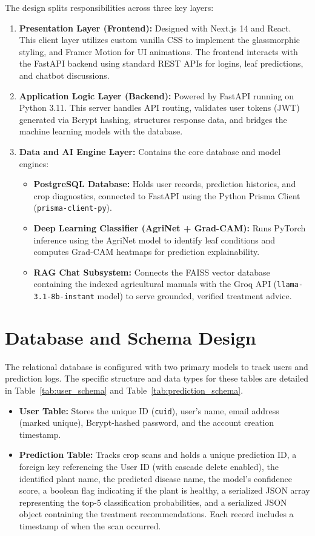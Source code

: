 \documentclass[12pt, a4paper]{report}
\begin{document}
The design splits responsibilities across three key layers:
\begin{enumerate}
    \item \textbf{Presentation Layer (Frontend):} Designed with Next.js 14 and React. This client layer utilizes custom vanilla CSS to implement the glassmorphic styling, and Framer Motion for UI animations. The frontend interacts with the FastAPI backend using standard REST APIs for logins, leaf predictions, and chatbot discussions.
    \item \textbf{Application Logic Layer (Backend):} Powered by FastAPI running on Python 3.11. This server handles API routing, validates user tokens (JWT) generated via Bcrypt hashing, structures response data, and bridges the machine learning models with the database.
    \item \textbf{Data and AI Engine Layer:} Contains the core database and model engines:
    \begin{itemize}
        \item \textbf{PostgreSQL Database:} Holds user records, prediction histories, and crop diagnostics, connected to FastAPI using the Python Prisma Client (\texttt{prisma-client-py}).
        \item \textbf{Deep Learning Classifier (AgriNet + Grad-CAM):} Runs PyTorch inference using the AgriNet model to identify leaf conditions and computes Grad-CAM heatmaps for prediction explainability.
        \item \textbf{RAG Chat Subsystem:} Connects the FAISS vector database containing the indexed agricultural manuals with the Groq API (\texttt{llama-3.1-8b-instant} model) to serve grounded, verified treatment advice.
    \end{itemize}
\end{enumerate}

\section{Database and Schema Design}
The relational database is configured with two primary models to track users and prediction logs. The specific structure and data types for these tables are detailed in Table~\ref{tab:user_schema} and Table~\ref{tab:prediction_schema}.

\begin{itemize}
    \item \textbf{User Table:} Stores the unique ID (\texttt{cuid}), user's name, email address (marked unique), Bcrypt-hashed password, and the account creation timestamp.
    \item \textbf{Prediction Table:} Tracks crop scans and holds a unique prediction ID, a foreign key referencing the User ID (with cascade delete enabled), the identified plant name, the predicted disease name, the model's confidence score, a boolean flag indicating if the plant is healthy, a serialized JSON array representing the top-5 classification probabilities, and a serialized JSON object containing the treatment recommendations. Each record includes a timestamp of when the scan occurred.
\end{itemize}
\end{document}
